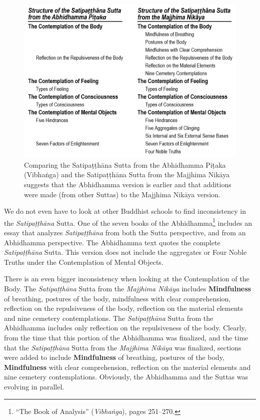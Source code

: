 \pagebreak

\begin{figure}[h]
\centering
\includegraphics[width=0.8\linewidth]{./Diagrams/Satipatthana}
\caption{Comparing the Satipaṭṭhāna Sutta from the Abhidhamma Piṭaka (Vibhaṅga) and the Satipaṭṭhāna Sutta from the Majjhima Nikāya suggests that the Abhidhamma version is earlier and that additions were made (from other Suttas) to the Majjhima Nikāya version.}
\label{fig:Satipatthana}
\end{figure}

We do not even have to look at other Buddhist schools to find inconsistency in the \textit{Satipaṭṭhāna} Sutta. One of the seven books of the Abhidhamma\footnote{“The Book of Analysis” (\textit{Vibhaṅga}), pages 251--270.} includes an essay that analyzes \textit{Satipaṭṭhāna} from both the Sutta perspective, and from an Abhidhamma perspective. The Abhidhamma text quotes the complete \textit{Satipaṭṭhāna} Sutta. This version does not include the aggregates or Four Noble Truths under the Contemplation of Mental Objects.

There is an even bigger inconsistency when looking at the Contemplation of the Body. The \textit{Satipaṭṭhāna} Sutta from the \textit{Majjhima Nikāya} includes \textbf{Mindfulness} of breathing, postures of the body, mindfulness with clear comprehension, reflection on the repulsiveness of the body, reflection on the material elements and nine cemetery contemplations. The \textit{Satipaṭṭhāna} Sutta from the Abhidhamma includes only reflection on the repulsiveness of the body. Clearly, from the time that this portion of the Abhidhamma was finalized, and the time that the \textit{Satipaṭṭhāna} Sutta from the \textit{Majjhima Nikāya} was finalized, sections were added to include \textbf{Mindfulness} of breathing, postures of the body, \textbf{Mindfulness} with clear comprehension, reflection on the material elements and nine cemetery contemplations. Obviously, the Abhidhamma and the Suttas was evolving in parallel.

